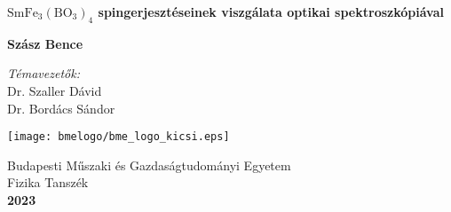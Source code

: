 \begin{titlepage}
    \begin{center}
        \vspace*{1cm}
            
        \Huge
        \textbf{\bf $\bm{\mathrm{SmFe_3(BO_3)_4}}$ spingerjesztéseinek viszgálata optikai spektroszkópiával }
        \\
         
        \vspace{1,5cm}
        \LARGE
        
            
        \vspace{2.0cm}
            
        \textbf{Szász Bence}
            
        \vspace{2.0cm}
            
        \textit{Témavezetők:}
        \\
        Dr. Szaller Dávid\\
        Dr. Bordács Sándor
            
        \vspace{2.5cm}
            
        \texttt{[image: bmelogo/bme\_logo\_kicsi.eps]}
            
            \vspace*{1cm}
        \Large
        Budapesti Műszaki és Gazdaságtudományi Egyetem\\
        Fizika Tanszék\\
        \vspace*{1cm}
       \textbf{2023}
            
    \end{center}
\end{titlepage}